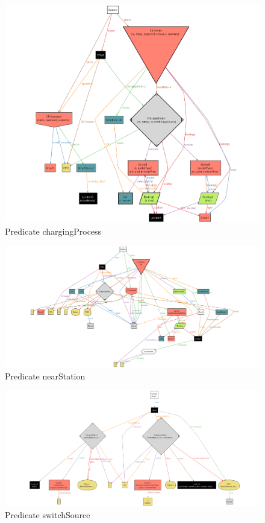 \documentclass[table, 12pt]{article} %
\begin{document}
    \begin{center}
        \begin{figure}[H]
            \includegraphics[scale=0.38, center]{assets/alloy/pred_chargingProcess.png}
            \caption{Predicate chargingProcess}
            \label{fig: chargingProcess_alloy}
        \end{figure}
    \end{center}
    \begin{figure}
        \centering
            \includegraphics[scale=0.40, center]{assets/alloy/pred_nearStation.png}
            \caption{Predicate nearStation}
            \label{fig: nearStation_alloy}
    \end{figure}
    \begin{figure}
        \centering
            \includegraphics[scale=0.33, center]{assets/alloy/pred_switchSources.png}
            \caption{Predicate switchSource}
            \label{fig: switchSources_alloy}
    \end{figure}
\end{document}
